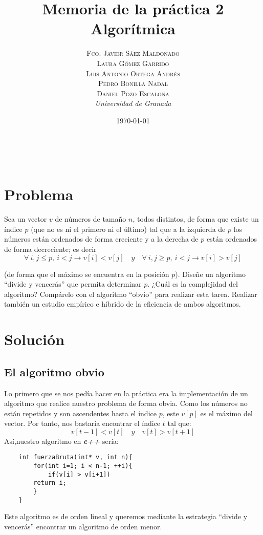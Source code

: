 \documentclass[a4paper, 11pt]{article}
\title{\textbf{Memoria de la práctica 2}\\ %
Algorítmica} %
\author{\textsc{Fco. Javier Sáez Maldonado}\\ %
\textsc{Laura Gómez Garrido}\\
\textsc{Luis Antonio Ortega Andrés}\\
\textsc{Pedro Bonilla Nadal}\\
\textsc{Daniel Pozo Escalona}\vspace{2cm}
\\{\textit{Universidad de Granada}}} %
\date{\today} %
\makeatletter
\renewcommand{\maketitle}{
  \begin{flushright} %
  
  {\LARGE\@title} %
  
  \vspace{50pt} %
  
  {\large\@author} %
  \\\@date %
  \vspace{40pt} %
  \end{flushright}
}
\makeatother
\begin{document}
\maketitle %


{\parskip=2pt
  \tableofcontents
}
\pagebreak



\section{Problema}

Sea un vector $v$ de números de tamaño $n$, todos distintos, de forma que existe un índice $p$ (que no es ni el primero ni el último) tal que a la izquierda de $p$ los números están ordenados de forma creciente y a la derecha de $p$ están ordenados de forma decreciente; es decir
\[
\forall \ i,j \leq p , \ i < j \rightarrow v[i] < v[j] \quad y \quad \forall \ i,j \geq p, \ i < j \rightarrow v[i]>v[j]
\]

(de forma que el máximo se encuentra en la posición $p$). Diseñe un algoritmo ``divide y vencerás'' que permita determinar $p$. ¿Cuál es la complejidad del algoritmo? Compárelo con el algoritmo ``obvio'' para realizar esta tarea. Realizar también un estudio empírico e híbrido de la eficiencia de ambos algoritmos.

\section{Solución}

\subsection{El algoritmo obvio}
Lo primero que se nos pedía hacer en la práctica era la implementación de un algoritmo que realice nuestro problema de forma obvia. Como los números no están repetidos y son ascendentes hasta el índice $p$, este $v[p]$ es el máximo del vector. Por tanto, nos bastaría encontrar el índice $t$ tal que:
\[
v[t-1] < v[t] \quad y \quad v[t] > v[t+1]
\]
Así,nuestro algoritmo en\textbf{ \emph{c++} } sería:
\begin{lstlisting}
	int fuerzaBruta(int* v, int n){
		for(int i=1; i < n-1; ++i){
     		if(v[i] > v[i+1])
       	return i;
		}
	}
\end{lstlisting}

Este algoritmo es de orden lineal y queremos mediante la estrategia ``divide y vencerás'' encontrar un algoritmo de orden menor.
\end{document}
